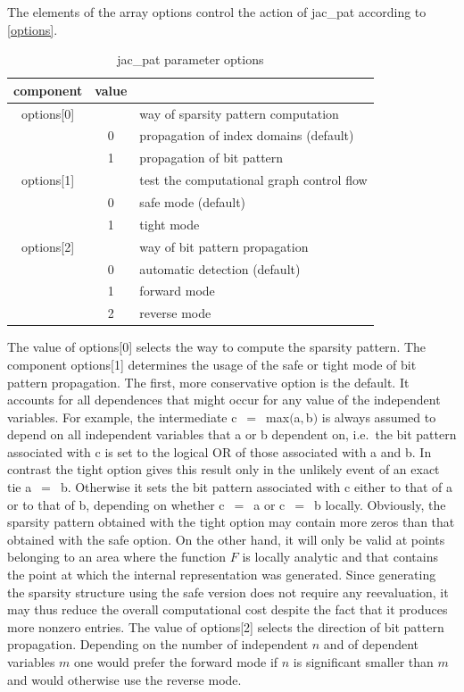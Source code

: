 \documentclass[11pt,twoside]{article}
\begin{document}
The elements of the array {\sf options} control the action of 
{\sf jac\_pat} according to \autoref{options}.
\begin{table}[h]
\center
\begin{tabular}{|c|c|l|} \hline
component & value &  \\ \hline
{\sf options[0]} &    &  way of sparsity pattern computation \\
                 & 0  &  propagation of index domains (default) \\
                 & 1  &  propagation of bit pattern \\ \hline
{\sf options[1]} &    &  test the computational graph control flow \\
                 & 0  &  safe mode (default) \\
                 & 1  &  tight mode \\ \hline
{\sf options[2]} &    &  way of bit pattern propagation \\
                 & 0  &  automatic detection (default) \\
                 & 1  &  forward mode \\ 
                 & 2  &  reverse mode \\ \hline
\end{tabular}
\caption{ {\sf jac\_pat} parameter {\sf options}\label{options}}
\end{table}           
The value of {\sf options[0]} selects the way to compute the sparsity
pattern. The component {\sf options[1]} determines
the usage of the safe or tight mode of bit pattern propagation.
The first, more conservative option is the default. It accounts for all 
dependences that might occur for any value of the
independent variables. For example, the intermediate 
{\sf c}~$=$~{\sf max}$(${\sf a}$,${\sf b}$)$ is
always assumed to depend on all independent variables that {\sf a} or {\sf b}
dependent on, i.e.\ the bit pattern associated with {\sf c} is set to the
logical {\sf OR} of those associated with {\sf a} and {\sf b}. 
In contrast
the tight option gives this result only in the unlikely event of an exact
tie {\sf a}~$=$~{\sf b}. Otherwise it sets the bit pattern
associated with {\sf c} either to that of {\sf a} or to that of {\sf b},
depending on whether {\sf c}~$=$~{\sf a} or {\sf c}~$=$~{\sf b} locally.
Obviously, the sparsity pattern obtained with the tight option may contain
more zeros than that obtained with the safe option. On the other hand, it
will only be valid at points belonging to an area where the function $F$ is locally
analytic and that contains the point at which the internal representation was
generated. Since generating the sparsity structure using the safe version does not
require any reevaluation, it may thus reduce the overall computational cost 
despite the fact that it produces more nonzero entries. The value of
{\sf options[2]} selects the direction of bit pattern propagation. 
Depending on the number of independent $n$ and of dependent variables $m$ 
one would prefer the forward mode if $n$ is significant smaller than $m$ and
would otherwise use the reverse mode.
\end{document}

